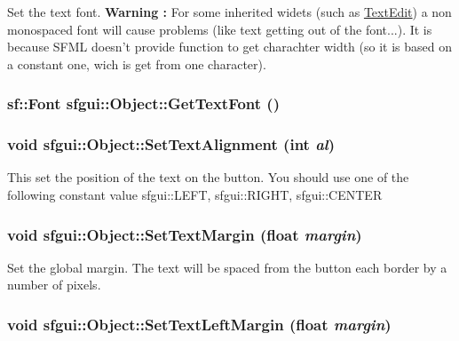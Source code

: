 Set the text font. {\bf Warning : } For some inherited widets (such as \hyperlink{classsfgui_1_1TextEdit}{TextEdit}) a non monospaced font will cause problems (like text getting out of the font...). It is because SFML doesn't provide function to get charachter width (so it is based on a constant one, wich is get from one character). \hypertarget{classsfgui_1_1Object_5f1d579d8ebba512fb983622552fe40f}{
\subsubsection[GetTextFont]{\setlength{\rightskip}{0pt plus 5cm}sf::Font sfgui::Object::GetTextFont ()}}
\label{classsfgui_1_1Object_5f1d579d8ebba512fb983622552fe40f}


\hypertarget{classsfgui_1_1Object_191bba44abbc751fd80e6f19ad6aba5b}{
\subsubsection[SetTextAlignment]{\setlength{\rightskip}{0pt plus 5cm}void sfgui::Object::SetTextAlignment (int {\em al})}}
\label{classsfgui_1_1Object_191bba44abbc751fd80e6f19ad6aba5b}




This set the position of the text on the button. You should use one of the following constant value sfgui::LEFT, sfgui::RIGHT, sfgui::CENTER \hypertarget{classsfgui_1_1Object_f71c39eb2dfd2eb76e9be9e5dad606d9}{
\subsubsection[SetTextMargin]{\setlength{\rightskip}{0pt plus 5cm}void sfgui::Object::SetTextMargin (float {\em margin})}}
\label{classsfgui_1_1Object_f71c39eb2dfd2eb76e9be9e5dad606d9}




Set the global margin. The text will be spaced from the button each border by a number of pixels. \hypertarget{classsfgui_1_1Object_28408aa0cf50c8da37a79215755c01d9}{
\subsubsection[SetTextLeftMargin]{\setlength{\rightskip}{0pt plus 5cm}void sfgui::Object::SetTextLeftMargin (float {\em margin})}}
\label{classsfgui_1_1Object_28408aa0cf50c8da37a79215755c01d9}




